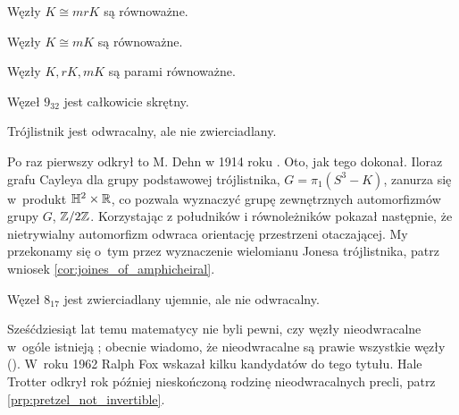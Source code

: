 \begin{definition}
    Węzły $K \cong mrK$ są równoważne. %
\end{definition}

\begin{definition}
    Węzły $K \cong mK$ są równoważne. %
\end{definition}

\begin{definition}
    Węzły $K, rK, mK$ są parami równoważne. %
\end{definition}

\begin{example}
    Węzeł $9_{32}$ jest całkowicie skrętny.
\end{example}


\begin{example}
    \label{exm:trefoil_is_chiral}
    Trójlistnik jest odwracalny, ale nie zwierciadlany.
\end{example}

Po raz pierwszy odkrył to M. Dehn w 1914 roku \cite{dehn14}.
Oto, jak tego dokonał.
Iloraz grafu Cayleya dla grupy podstawowej trójlistnika, $G = \pi_1(S^3 - K)$, zanurza się w~produkt $\mathbb H^2 \times \mathbb R$, co pozwala wyznaczyć grupę zewnętrznych automorfizmów grupy $G$, $\mathbb Z/2\mathbb Z$.
Korzystając z południków i równoleżników pokazał następnie, że nietrywialny automorfizm odwraca orientację przestrzeni otaczającej.
My przekonamy się o~tym przez wyznaczenie wielomianu Jonesa trójlistnika, patrz wniosek \ref{cor:joines_of_amphicheiral}.

\begin{example}
    Węzeł $8_{17}$ jest zwierciadlany ujemnie, ale nie odwracalny.
\end{example}

Sześćdziesiąt lat temu matematycy nie byli pewni, czy węzły nieodwracalne w~ogóle istnieją \cite[problem 10]{fox62};
obecnie wiadomo, że nieodwracalne są prawie wszystkie węzły (\cite[s.~46]{murasugi96}).
W~roku 1962 Ralph Fox wskazał kilku kandydatów do tego tytułu.
Hale Trotter odkrył rok później nieskończoną rodzinę nieodwracalnych precli, patrz \ref{prp:pretzel_not_invertible}.

